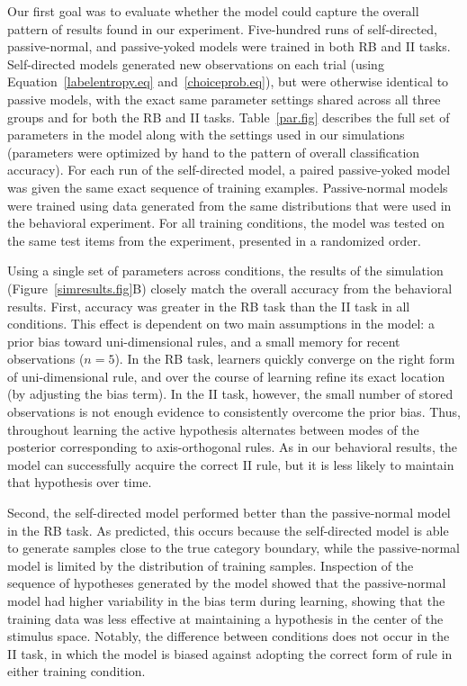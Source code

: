 \documentclass[3p,twocolumn,authoryear,10pt]{elsarticle}
\begin{document}
Our first goal was to evaluate whether the model could capture the overall pattern of results found in our experiment. Five-hundred runs of self-directed, passive-normal, and passive-yoked models were trained in both RB and II tasks.   Self-directed models generated new observations on each trial (using Equation~\ref{labelentropy.eq} and~\ref{choiceprob.eq}), but were otherwise identical to passive models, with the exact same parameter settings shared across all three groups and for both the RB and II tasks.  Table~\ref{par.fig} describes the full set of parameters in the model along with the settings used in our simulations (parameters were optimized by hand to the pattern of overall classification accuracy).  For each run of the self-directed model, a paired passive-yoked model was given the same exact sequence of training examples. Passive-normal models were trained using data generated from the same distributions that were used in the behavioral experiment. For all training conditions, the model was tested on the same test items from the experiment, presented in a randomized order. 

Using a single set of parameters across conditions, the results of the simulation (Figure~\ref{simresults.fig}B) closely match the overall accuracy from the behavioral results. First,  accuracy was greater in the RB task than the II task in all conditions. This effect is dependent on two main assumptions in the model: a prior bias toward uni-dimensional rules, and a small memory for recent observations ($n=5$). In the RB task, learners quickly converge on the right form of uni-dimensional rule, and over the course of learning refine its exact location (by adjusting the bias term). In the II task, however, the small number of stored observations is not enough evidence to consistently overcome the prior bias. Thus, throughout learning the active hypothesis alternates between modes of the posterior corresponding to axis-orthogonal rules. As in our behavioral results, the model can successfully acquire the correct II rule, but it is less likely to maintain that hypothesis over time. 

Second, the self-directed model performed better than the passive-normal model in the RB task. As predicted, this occurs because the self-directed model is able to generate samples close to the true category boundary, while the passive-normal model is limited by the distribution of training samples. Inspection of the sequence of hypotheses generated by the model showed that the passive-normal model had higher variability in the bias term during learning, showing that the training data was less effective at maintaining a hypothesis in the center of the stimulus space. Notably, the difference between conditions does not occur in the II task, in which the model is biased against adopting the correct form of rule in either training condition.
\end{document}

